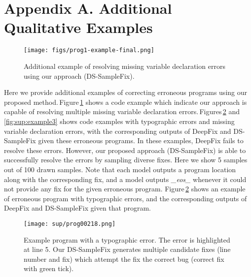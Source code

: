 \documentclass[letterpaper]{article} \usepackage{aaai20}  \usepackage{times}  \usepackage{helvet} \usepackage{courier}  \usepackage[hyphens]{url}  \usepackage{graphicx}
\newcommand{\dssmaplefix}{DS-SampleFix}
\newcommand{\figref}{Figure}
\newcommand{\figsref}{Figures}
\begin{document}



\newpage

\section*{Appendix A. Additional Qualitative Examples}
\label{sec:aditional}

\begin{figure}[b] 
	\centering
	\texttt{[image: figs/prog1-example-final.png]} 
	\caption{Additional example of resolving missing variable declaration errors using our approach (\dssmaplefix). }
	\label{fig:examples:missdec}
	\vspace{-.1cm}
\end{figure}


Here we provide additional examples of correcting erroneous programs using our proposed method.\,\figref \,\ref{fig:examples:missdec} shows a code example which indicate our approach is capable of resolving multiple missing variable declaration errors.\,\figsref \,\ref{fig:sup:example2} and \ref{fig:sup:example3} shows code examples with typographic errors and missing variable declaration errors, with the corresponding outputs of DeepFix and DS-SampleFix given these erroneous programs. In these examples, DeepFix fails to resolve these errors. However, our proposed approach (DS-SampleFix) is able to successfully resolve the errors by sampling diverse fixes. Here we show 5 samples out of 100 drawn samples. Note that each model outputs a program location along with the corresponding fix, and a model outputs  \textit{\_eos\_} whenever it could not provide any fix for the given erroneous program. \figref \,\ref{fig:sup:example2} shows an example of erroneous program with typographic errors, and the corresponding outputs of DeepFix and DS-SampleFix given that program.




\begin{figure}[b] 
	\centering
	    \centering
		\texttt{[image: sup/prog00218.png]}
	
	\caption{Example program with a typographic error. The error is highlighted at line 5. Our DS-SampleFix generates multiple candidate fixes (line number and fix) which attempt the fix the correct bug (correct fix with green tick).}
	\label{fig:sup:example2}
	\vspace{-.1cm}
\end{figure}
\end{document}
